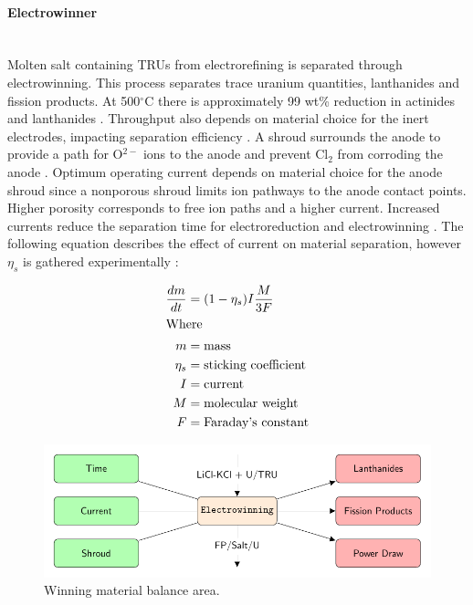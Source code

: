 \paragraph{Electrowinner} \mbox{}\\
Molten salt containing \glspl{TRU} from electrorefining is separated through electrowinning. This process separates trace uranium quantities, lanthanides and fission products. 
At 500$^{\circ}$C there is approximately 99 wt\% reduction in actinides and lanthanides \cite{flowsheet_1998}. 
Throughput also depends on material choice for the inert electrodes, impacting separation 
efficiency \cite{koyama_development_2012}. A shroud surrounds the anode to provide a path for O$^{2-}$ ions to the anode and 
prevent Cl$_2$ from corroding the anode \cite{kim_development_2013,choi_electrochemical_2015}. Optimum operating current 
depends on material choice for the anode shroud since a nonporous shroud limits ion pathways to the anode contact points.
Higher porosity corresponds to free ion paths and a higher current. Increased currents reduce the separation time for electroreduction and electrowinning \cite{choi_electrochemical_2015}.
The following equation describes the effect of current on material separation, however $\eta_s$ is gathered experimentally \cite{ahluwalia_uranium_2004}:

\begin{align}
\frac{dm}{dt} &= (1-\eta_s)I\frac{M}{3F} \\
\intertext{Where}
m &= \mbox{mass} \nonumber \\
\eta_s &= \mbox{sticking coefficient} \nonumber \\
I &= \mbox{current} \nonumber \\
M &= \mbox{molecular weight} \nonumber \\
F &= \mbox{Faraday's constant} \nonumber
\end{align}

\begin{figure}[h] 
	\centering
	\includegraphics[width=0.8\linewidth]{images/winning}
	\caption{Winning material balance area.}
	\label{fig:winning}
\end{figure}

